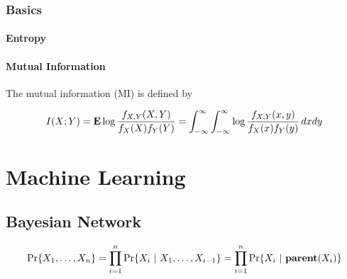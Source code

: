 \documentclass[10pt, twoside]{book}   	%
\begin{document}
\section{Basics}


\subsection{Entropy}

\subsection{Mutual Information}

The mutual information (MI) is defined by

\begin{equation}
I(X;Y) = \mathop{\bf E{}} \log \frac{f_{X,Y}(X,Y)}{f_{X}(X)f_{Y}(Y)}
= \int_{-\infty}^{\infty} \int_{-\infty}^{\infty} \log \frac{f_{X,Y}(x,y)}{f_{X}(x)f_{Y}(y)} \, dx dy
\end{equation}





\part{Machine Learning}

\chapter{Bayesian Network}


\begin{equation}
\Pr\{X_1,\ldots,X_n\}
= \prod_{i=1}^n \Pr\{X_i~|~X_1,\ldots,X_{i-1}\}
= \prod_{i=1}^n \Pr\{X_i~|~\mathbf{parent}(X_i)\}
\end{equation}
\end{document}
